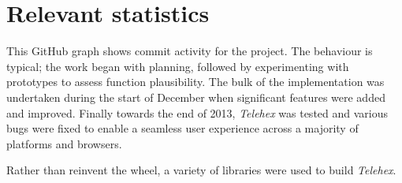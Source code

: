 \documentclass[12pt, a4paper]{article}
\begin{document}
\newpage
\section{Relevant statistics}

\begin{figure}[ht!]
\begin{floatrow}
\end{floatrow}
\end{figure}

This GitHub graph shows commit activity for the project. The behaviour is typical; the work began with planning, followed by experimenting with prototypes to assess function plausibility. The bulk of the implementation was undertaken during the start of December when significant features were added and improved. Finally towards the end of 2013, \textit{Telehex} was tested and various bugs were fixed to enable a seamless user experience across a majority of platforms and browsers. 

Rather than reinvent the wheel, a variety of libraries were used to build \textit{Telehex}.
\end{document}
